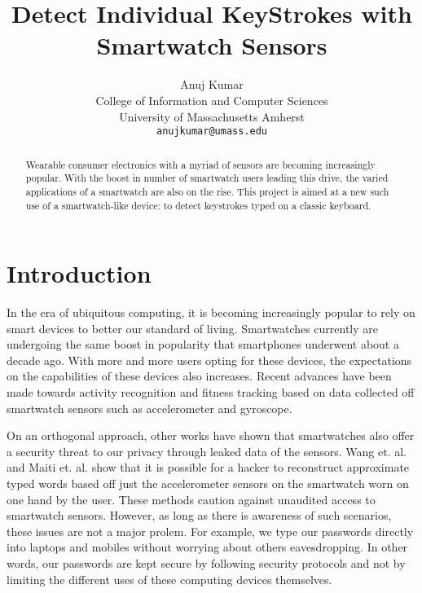 \documentclass[10pt,twocolumn,letterpaper]{article}
\begin{document}
\title{Detect Individual KeyStrokes with Smartwatch Sensors}

\author{Anuj Kumar\\
College of Information and Computer Sciences\\
University of Massachusetts Amherst\\
{\tt\small anujkumar@umass.edu}
}

\maketitle

\begin{abstract}
Wearable consumer electronics with a myriad of sensors are becoming increasingly popular.
With the boost in number of smartwatch users leading this drive, the varied applications of a smartwatch are also on the rise.
This project is aimed at a new such use of a smartwatch-like device: to detect keystrokes typed on a classic keyboard.
\end{abstract}

\section{Introduction}
In the era of ubiquitous computing, it is becoming increasingly popular to rely on smart devices to better our standard of living. Smartwatches currently are undergoing the same boost in popularity that smartphones underwent about a decade ago. With more and more users opting for these devices, the expectations on the capabilities of these devices also increases. Recent advances have been made towards activity recognition \cite{ravi} and fitness tracking \cite{dunn} based on data collected off smartwatch sensors such as accelerometer and gyroscope.

On an orthogonal approach, other works have shown that smartwatches also offer a security threat to our privacy through leaked data of the sensors. Wang et. al. \cite{wang} and Maiti et. al. \cite{maiti} show that it is possible for a hacker to reconstruct approximate typed words based off just the accelerometer sensors on the smartwatch worn on one hand by the user. These methods caution against unaudited access to smartwatch sensors. However, as long as there is awareness of such scenarios, these issues are not a major prolem. For example, we type our passwords directly into laptops and mobiles without worrying about others eavesdropping. In other words, our passwords are kept secure by following security protocols and not by limiting the different uses of these computing devices themselves.
\end{document}
